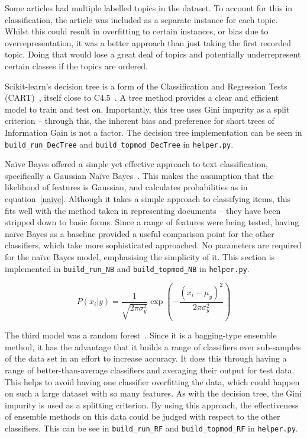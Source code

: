 \documentclass[11pt]{article}
\begin{document}
Some articles had multiple labelled topics in the dataset. To account for this in classification, the article was included as a separate instance for each topic. Whilst this could result in overfitting to certain instances, or bias due to overrepresentation, it was a better approach than just taking the first recorded topic. Doing that would lose a great deal of topics and potentially underrepresent certain classes if the topics are ordered.

Scikit-learn's decision tree is a form of the Classification and Regression Tests (CART)~\cite{trees}, itself close to C4.5~\cite{c45}. A tree method provides a clear and efficient model to train and test on. Importantly, this tree uses Gini impurity as a split criterion – through this, the inherent bias and preference for short trees of Information Gain is not a factor. The decision tree implementation can be seen in \texttt{build\_run\_DecTree} and \texttt{build\_topmod\_DecTree} in \texttt{helper.py}.


Na{\"i}ve Bayes offered a simple yet effective approach to text classification, specifically a Gaussian Na{\"i}ve Bayes~\cite{nb}. This makes the assumption that the likelihood of features is Gaussian, and calculates probabilities as in equation~\ref{naive}.  Although it takes a simple approach to classifying items, this fits well with the method taken in representing documents – they have been stripped down to basic forms. Since a range of features were being tested, having na{\"i}ve Bayes as a baseline provided a useful comparison point for the other classifiers, which take more sophisticated approached. No parameters are required for the na{\"i}ve Bayes model, emphasising the simplicity of it. This section is implemented in \texttt{build\_run\_NB} and \texttt{build\_topmod\_NB} in \texttt{helper.py}.

\begin{equation}
\label{naive}
P(x_{i} \vert y) = \frac{1}{\sqrt{2 \pi \sigma_{y}^{2}}}\exp\left(-\frac{(x_{i}-\mu_{y})^{2}}{2\pi \sigma_{y}^{2}}\right)
\end{equation}

The third model was a random forest~\cite{randomforests}. Since it is a bagging-type ensemble method, it has the advantage that it builds a range of classifiers over sub-samples of the data set in an effort to increase accuracy. It does this through having a range of better-than-average classifiers and averaging their output for test data. This helps to avoid having one classifier overfitting the data, which could happen on such a large dataset with so many features. As with the decision tree, the Gini impurity is used as a splitting criterion. By using this approach, the effectiveness of ensemble methods on this data could be judged with respect to the other classifiers. This can be see in \texttt{build\_run\_RF} and \texttt{build\_topmod\_RF} in \texttt{helper.py}.
\end{document}
